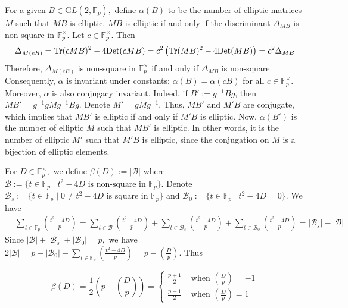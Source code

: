 \documentclass[12pt,reqno]{amsart}
\theoremstyle{plain}
\theoremstyle{definition}
\newcommand{\Det}{\mathrm{Det}}
\newcommand{\Tr}{{\rm Tr}}
\newcommand{\GL}{{\mathrm GL}}
\newcommand{\sB}{{\mathcal B}}
\theoremstyle{remark}
\newcommand{\FF}{\mathbb{F}}
\begin{document}
For a given $B \in \GL(2, \FF_p),$ define $\alpha(B)$ to be the number of elliptic matrices $M$ such that $MB$ is elliptic. $MB$ is elliptic if and only if the discriminant $\Delta_{MB}$ is non-square in $\FF_p^{\times}.$ Let $c\in \FF_p^{\times}$. Then  
$$\Delta_{M(cB)}=\Tr(cMB)^2 - 4 \Det(cMB) = c^2 \left(\Tr(MB)^2 -4\Det(MB)\right)=c^2 \Delta_{MB}$$
Therefore, $\Delta_{M(cB)}$ is non-square in $\FF_p^{\times}$ if and only if $\Delta_{MB}$ is non-square. Consequently, $\alpha$ is invariant under constants: $\alpha(B) =\alpha(cB)$ for all $c \in \FF_p^{\times}.$ Moreover, $\alpha$ is also conjugacy invariant. Indeed, if $B':= g^{-1}Bg$, then $MB'= g^{-1}gMg^{-1}Bg$. Denote $M'=gMg^{-1}.$ Thus, $MB'$ and $M'B$ are conjugate, which implies that $MB'$ is elliptic if and only if $M'B$ is elliptic. Now, $\alpha(B')$ is the number of elliptic $M$ such that $MB'$ is elliptic. In other words, it is the number of elliptic $M'$ such that $M'B$ is elliptic, since the conjugation on $M$ is a bijection of elliptic elements. 

For $D \in \FF_p^{\times},$ we define $\beta(D):=|\sB| $ where $\sB:=\{ t \in \FF_p \mid t^2 -4D \text{~is non-square in~} \FF_p \}$. Denote 
$\sB_s:=\{ t \in \FF_p \mid 0 \neq t^2 -4D \text{~is square in~} \FF_p \}$ and $\sB_0:=\{ t \in \FF_p \mid t^2 -4D=0 \}$. We have 
 \begin{align*}
    &\sum_{t\in \FF_p}\left(\frac{t^2-4D}{p}\right) = \sum_{t \in \sB}\left(\frac{t^2-4D}{p}\right)+\sum_{t \in \sB_s}\left(\frac{t^2-4D}{p}\right) +\sum_{t \in \sB_0}\left(\frac{t^2-4D}{p}\right)=|\sB_s|-|\sB|
\end{align*}
Since $|\sB|+ |\sB_s| +|\sB_0| = p,$ we have $2|\sB|= p-|\sB_0| - \sum_{t\in \FF_p}\left(\frac{t^2-4D}{p}\right)= p-\left(\frac{D}{p}\right).$
Thus 

\begin{equation}\label{eq: beta D values}
    \beta(D)=\frac{1}{2}\left(p-\left(\frac{D}{p}\right)\right)=\begin{cases}
    \frac{p+1}{2} & \text{~when~} \left(\frac{D}{p}\right)=-1\\
    \frac{p-1}{2} & \text{~when~} \left(\frac{D}{p}\right)=1 
    \end{cases}
\end{equation}
\end{document}
